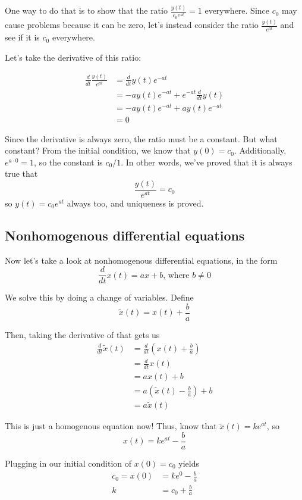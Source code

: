 \documentclass[11pt]{article}
\begin{document}
One way to do that is to show that the ratio $\frac{y(t)}{c_0e^{at}}=1$ everywhere. Since $c_0$ may cause problems because it can be zero, let's instead consider the ratio $\frac{y(t)}{e^{at}}$ and see if it is $c_0$ everywhere.

Let's take the derivative of this ratio:

\begin{align*}
    \frac d{dt}\frac {y(t)}{e^{at}}&=\frac d{dt}y(t)e^{-at}\\
    &=-ay(t)e^{-at}+e^{-at}\frac d{dt}y(t)\\
    &=-ay(t)e^{-at}+ay(t)e^{-at}\\
    &=0
\end{align*}

Since the derivative is always zero, the ratio must be a constant. But what constant? From the initial condition, we know that $y(0)=c_0$. Additionally, $e^{a\cdot 0}=1$, so the constant is $c_0/1$. In other words, we've proved that it is always true that \[\frac{y(t)}{e^{at}}=c_0\] so $y(t)=c_0e^{at}$ always too, and uniqueness is proved.

\subsection{Nonhomogenous differential equations}

Now let's take a look at nonhomogenous differential equations, in the form \[\frac d{dt}x(t)=ax+b\text{, where $b\ne 0$}\]

We solve this by doing a change of variables. Define \[\tilde x(t)=x(t)+\frac ba\]

Then, taking the derivative of that gets us 
\begin{align*}
    \frac d{dt}\tilde x(t)&=\frac d{dt}\left(x(t)+\frac ba\right)\\
    &=\frac d{dt}x(t)\\
    &=ax(t)+b\\
    &=a\left(\tilde x(t)-\frac ba\right)+b\\
    &=a\tilde x(t)
\end{align*}

This is just a homogenous equation now! Thus, know that $\tilde x(t)=ke^{at}$, so \[x(t)=ke^{at}-\frac ba\]

Plugging in our initial condition of $x(0)=c_0$ yields 
\begin{align*}
    c_0=x(0)&=ke^0-\frac ba\\
    k&=c_0+\frac ba
\end{align*}
\end{document}

